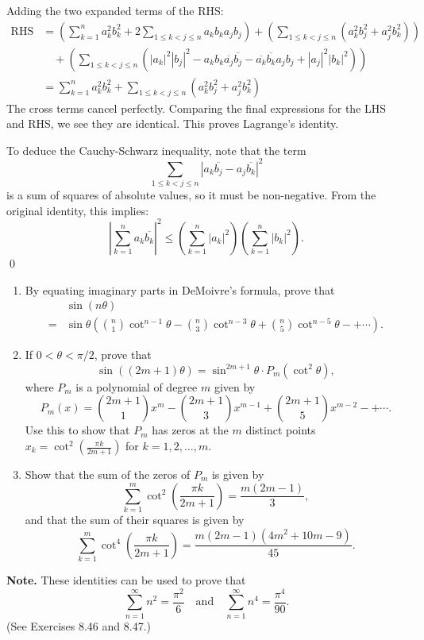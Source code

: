 Adding the two expanded terms of the RHS:
\begin{align*}
\text{RHS} &= \left( \sum_{k=1}^n a_k^2 b_k^2 + 2 \sum_{1 \leq k < j \leq n} a_k b_k a_j b_j \right) + \left( \sum_{1 \leq k < j \leq n} (a_k^2 b_j^2 + a_j^2 b_k^2) \right) \\
&\quad + \left( \sum_{1 \leq k < j \leq n} (|a_k|^2 |b_j|^2 - a_k b_k \overline{a_j} \overline{b_j} - \overline{a_k} \overline{b_k} a_j b_j + |a_j|^2 |b_k|^2) \right) \\
&= \sum_{k=1}^n a_k^2 b_k^2 + \sum_{1 \leq k < j \leq n} (a_k^2 b_j^2 + a_j^2 b_k^2)
\end{align*}
The cross terms cancel perfectly. Comparing the final expressions for the LHS and RHS, we see they are identical. This proves Lagrange's identity.

To deduce the Cauchy-Schwarz inequality, note that the term $$\sum_{1 \leq k < j \leq n} |a_k \overline{b_j} - a_j \overline{b_k}|^2$$ is a sum of squares of absolute values, so it must be non-negative. From the original identity, this implies:
\[ \left| \sum_{k=1}^n a_k \overline{b_k} \right|^2 \leq \left( \sum_{k=1}^n |a_k|^2 \right) \left( \sum_{k=1}^n |b_k|^2 \right). \]\qed


\begin{problembox}
\begin{problemstatement}
\begin{enumerate}[label=\textbf{(\alph*)}]
\item By equating imaginary parts in DeMoivre's formula, prove that
\begin{align*}
&\sin(n\theta) \\
=& \sin \theta \left( \binom{n}{1} \cot^{n-1} \theta - \binom{n}{3} \cot^{n-3} \theta + \binom{n}{5} \cot^{n-5} \theta - + \cdots \right).
\end{align*}
\item If \( 0 < \theta < \pi/2 \), prove that
\[
\sin((2m+1)\theta) = \sin^{2m+1} \theta \cdot P_m(\cot^2 \theta),
\]
where \( P_m \) is a polynomial of degree \( m \) given by
\[
P_m(x) = \binom{2m+1}{1} x^m - \binom{2m+1}{3} x^{m-1} + \binom{2m+1}{5} x^{m-2} - +\cdots.
\]
Use this to show that \( P_m \) has zeros at the \( m \) distinct points \( x_k = \cot^2 \left( \frac{\pi k}{2m+1} \right) \) for \( k = 1, 2, \dots, m \).
\item Show that the sum of the zeros of \( P_m \) is given by
\[
\sum_{k=1}^m \cot^2 \left( \frac{\pi k}{2m+1} \right) = \frac{m(2m-1)}{3},
\]
and that the sum of their squares is given by
\[
\sum_{k=1}^m \cot^4 \left( \frac{\pi k}{2m+1} \right) = \frac{m(2m-1)(4m^2 + 10m - 9)}{45}.
\]
\end{enumerate}
\textbf{Note.} These identities can be used to prove that
\[
\sum_{n=1}^\infty n^2 = \frac{\pi^2}{6} \quad \text{and} \quad \sum_{n=1}^\infty n^4 = \frac{\pi^4}{90}.
\]
(See Exercises 8.46 and 8.47.)
\end{problemstatement}
\end{problembox}

